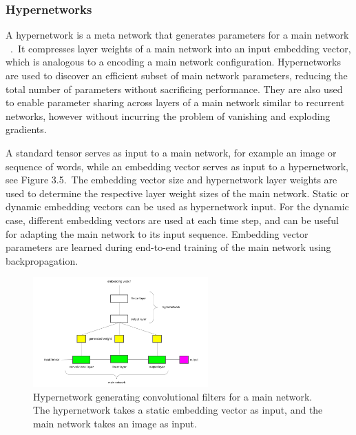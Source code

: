 \subsubsection{Hypernetworks}

A hypernetwork is a meta network that generates parameters for a main network \unskip ~\citep{ha2016hypernetworks}.\ It compresses layer weights of a main network into an input embedding vector, which is analogous to a encoding a main network configuration. Hypernetworks are used to discover an efficient subset of main network parameters, reducing the total number of parameters without sacrificing performance. They are also used to enable parameter sharing across layers of a main network similar to recurrent networks, however without incurring the problem of vanishing and exploding gradients. \par

\noindent A standard tensor serves as input to a main network, for example an image or sequence of words, while an embedding vector serves as input to a hypernetwork, see Figure 3.5.\ The embedding vector size and hypernetwork layer weights are used to determine the respective layer weight sizes of the main network. Static or dynamic embedding vectors  can be used as hypernetwork input. For the dynamic case, different embedding vectors are used at each time step, and can be useful for adapting the main network to its input sequence. Embedding vector parameters are learned during end-to-end training of the main network using backpropagation. \par

\begin{figure} [H]
   	\centering
    	\includegraphics[width=0.6\textwidth, height=0.4\textwidth]{hypernetwork.png}
	\captionsetup{justification=centering}
	\caption{Hypernetwork generating convolutional filters for a main network. The hypernetwork takes a static embedding vector as input, and the main network takes an image as input.}
\end{figure}

